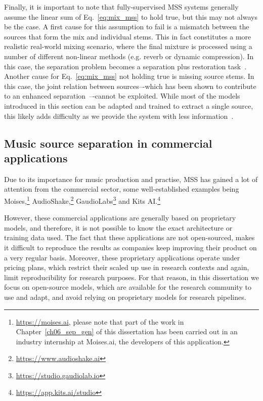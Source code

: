 Finally, it is important to note that fully-supervised \acrshort{MSS} systems generally assume the linear sum of Eq.~\ref{eq:mix_mss} to hold true, but this may not always be the case. A first cause for this assumption to fail is a mismatch between the sources that form the mix and individual stems. This in fact constitutes a more realistic real-world mixing scenario, where the final mixture is processed using a number of different non-linear methods (e.g. reverb or dynamic compression). In this case, the separation problem becomes a separation plus restoration task~\citep{zang-music_restoration}. Another cause for Eq.~\ref{eq:mix_mss} not holding true is missing source stems. In this case, %
the joint relation between sources–-which has been shown to contribute to an enhanced separation~\citep{kim-kuielab}–-cannot be exploited. While most of the models introduced in this section can be adapted and trained to extract a single source, this likely adds difficulty as we provide the system with less information~\citep{zhu-instglow}.


\subsection{Music source separation in commercial applications}
\label{ch02_sb:sec:music-source-separation-commercial}
Due to its importance for music production and practise, \acrshort{MSS} has gained a lot of attention from the commercial sector, some well-established examples being Moises,\footnote{\url{https://moises.ai}, please note that part of the work in Chapter~\ref{ch06_sep_gen} of this dissertation has been carried out in an industry internship at Moises.ai, the developers of this application.} AudioShake,\footnote{\url{https://www.audioshake.ai}} GaudioLabs\footnote{\url{https://studio.gaudiolab.io}} and Kits AI.\footnote{\url{https://app.kits.ai/studio}} 


However, these commercial applications are generally based on proprietary models, and therefore, it is not possible to know the exact architecture or training data used. The fact that these applications are not open-sourced, makes it difficult to reproduce the results as companies keep improving their product on a very regular basis.
Moreover, these proprietary applications operate under pricing plans, which restrict their scaled up use in research contexts and again, limit reproducibility for research purposes. For that reason, in this dissertation we focus on open-source models, which are available for the research community to use and adapt, and avoid relying on proprietary models for research pipelines.

